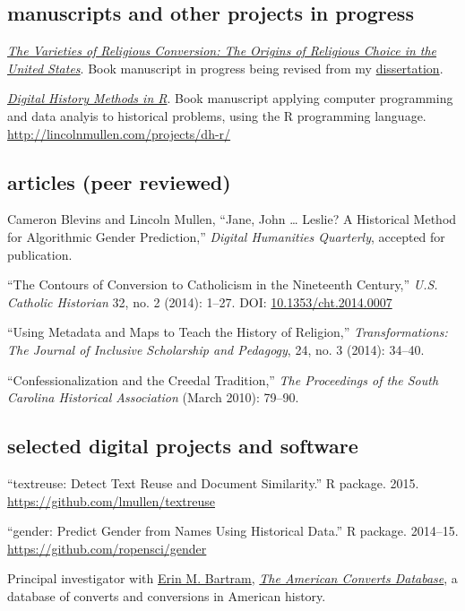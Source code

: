\documentclass[11pt]{article}
\begin{document}
\subsection{manuscripts and other projects in
progress}\label{manuscripts-and-other-projects-in-progress}

\emph{\href{/research/\#varieties}{The Varieties of Religious
Conversion: The Origins of Religious Choice in the United States}}.
Book manuscript in progress being revised from my
\href{/research/\#dissertation}{dissertation}.

\emph{\href{http://dh-r.lincolnmullen.com/}{Digital History Methods in
R}}. Book manuscript applying computer programming and data analyis to 
historical problems, using the R programming language. 
\url{http://lincolnmullen.com/projects/dh-r/}

\subsection{articles (peer reviewed)}\label{articles-peer-reviewed}

Cameron Blevins and Lincoln Mullen, ``Jane, John \ldots{} Leslie? A
Historical Method for Algorithmic Gender Prediction,'' \emph{Digital
Humanities Quarterly}, accepted for publication.

``The Contours of Conversion to Catholicism in the Nineteenth Century,''
\emph{U.S. Catholic Historian} 32, no. 2 (2014): 1--27. DOI:
\href{http://dx.doi.org/10.1353/cht.2014.0007}{10.1353/cht.2014.0007}

``Using Metadata and Maps to Teach the History of Religion,''
\emph{Transformations: The Journal of Inclusive Scholarship and
Pedagogy}, 24, no. 3 (2014): 34--40.

``Confessionalization and the Creedal Tradition,'' \emph{The Proceedings
of the South Carolina Historical Association} (March 2010): 79--90.

\subsection{selected digital projects and software}\label{digital-projects}

``textreuse: Detect Text Reuse and Document Similarity.'' R package. 2015. 
\url{https://github.com/lmullen/textreuse}

``gender: Predict Gender from Names Using Historical Data.'' R package. 
2014--15. \url{https://github.com/ropensci/gender}

Principal investigator with
\href{http://history.uconn.edu/doctoral-students/erin-m-bartram/}{Erin
M. Bartram}, \emph{\href{http://americanconverts.org}{The American
Converts Database}}, a database of converts and conversions in American
history.
\end{document}
